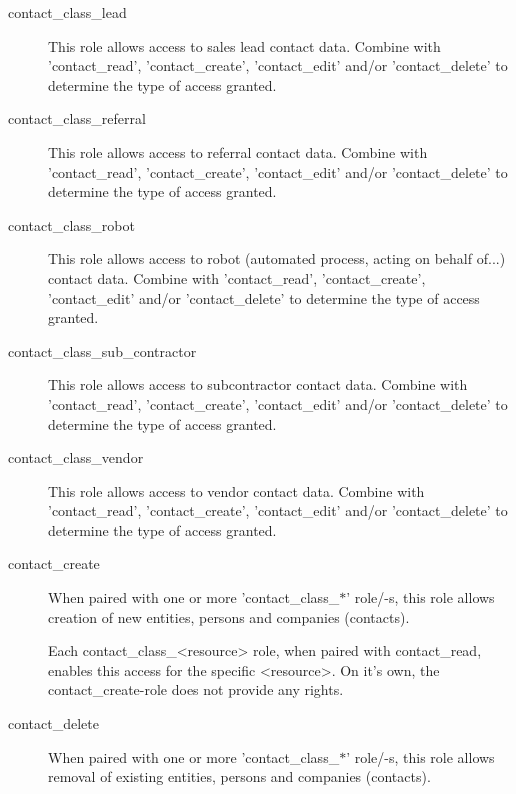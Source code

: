 \begin{description}
\item [contact\_class\_lead] \htmlspacing 
                         This role allows access to sales lead contact data.
                         Combine with 'contact\_read', 'contact\_create', 'contact\_edit' and/or 'contact\_delete' to determine
                         the type of access granted.
\item [contact\_class\_referral] \htmlspacing 
                         This role allows access to referral contact data.
                         Combine with 'contact\_read', 'contact\_create', 'contact\_edit' and/or 'contact\_delete' to determine
                         the type of access granted.
\item [contact\_class\_robot] \htmlspacing 
                         This role allows access to robot (automated process, acting on behalf of...) contact data.
                         Combine with 'contact\_read', 'contact\_create', 'contact\_edit' and/or 'contact\_delete' to determine
                         the type of access granted.
\item [contact\_class\_sub\_contractor] \htmlspacing 
                         This role allows access to subcontractor contact data.
                         Combine with 'contact\_read', 'contact\_create', 'contact\_edit' and/or 'contact\_delete' to determine
                         the type of access granted.
\item [contact\_class\_vendor] \htmlspacing 
                         This role allows access to vendor contact data.
                         Combine with 'contact\_read', 'contact\_create', 'contact\_edit' and/or 'contact\_delete' to determine
                         the type of access granted.
\item [contact\_create] \htmlspacing 
                         When paired with one or more 'contact\_class\_$\ast$' role/-s, this role allows
                         creation of new entities, persons and companies (contacts).

                         Each contact\_class\_\textless{}resource\textgreater{} role, when paired with contact\_read, enables
                         this access for the specific \textless{}resource\textgreater{}. On it's own, the contact\_create-role
                         does not provide any rights.
\item [contact\_delete] \htmlspacing 
                         When paired with one or more 'contact\_class\_$\ast$' role/-s, this role allows
                         removal of existing entities, persons and companies (contacts).


\end{description}
